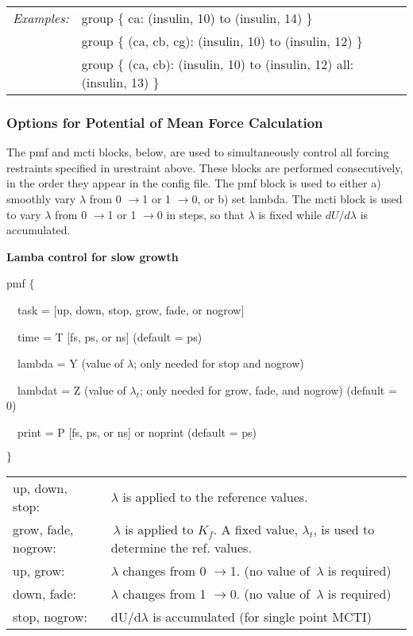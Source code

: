\begin{tabular}{ll}
{\em Examples:} & group $\{$ ca: (insulin, 10) to (insulin, 14) $\}$ \\ 
& group $\{$ (ca, cb, cg): (insulin, 10) to (insulin, 12) $\}$ \\ 
& group $\{$ (ca, cb): (insulin, 10) to (insulin, 12) all: (insulin, 13) $\}$
\pagebreak 
\end{tabular}
\pagebreak 

\subsubsection{Options for Potential of Mean Force Calculation}

The pmf and mcti blocks, below, are used to simultaneously control all
forcing restraints specified in urestraint above. These blocks are performed
consecutively, in the order they appear in the config file. The pmf block is
used to either a) smoothly vary $\lambda $ from 0 $\rightarrow $1 or 1 $%
\rightarrow $0, or b) set lambda. The mcti block is used to vary $\lambda $
from 0 $\rightarrow $1 or 1 $\rightarrow $0 in steps, so that $\lambda $ is
fixed while $dU/d\lambda $ is accumulated.\medskip

{\bf Lamba control for slow growth}

pmf $\{$

~~task = [up, down, stop, grow, fade, or nogrow]

~~time = T [fs, ps, or ns] (default = ps)

~~lambda = Y (value of $\lambda $; only needed for stop and nogrow)

~~lambdat = Z (value of $\lambda _{t}$; only needed for grow, fade, and
nogrow) (default = 0)

~~print = P [fs, ps, or ns] or noprint (default = ps)

$\}\medskip $

\begin{tabular}{ll}
up, down, stop: & $\lambda $ is applied to the reference values. \\ 
grow, fade, nogrow: & $\,\lambda $ is applied to $K_{f}$. A fixed value, $%
\lambda _{t}$, is used to determine the ref. values. \\ 
up, grow: & $\lambda $ changes from 0 $\rightarrow $1. (no value of $
\,\lambda $ is required) \\ 
down, fade: & $\lambda $ changes from 1 $\rightarrow $0. (no value of $%
\,\lambda $ is required) \\ 
stop, nogrow: & dU/d$\lambda $ is accumulated (for single point
MCTI)\medskip \smallskip
\end{tabular}
\bigskip

